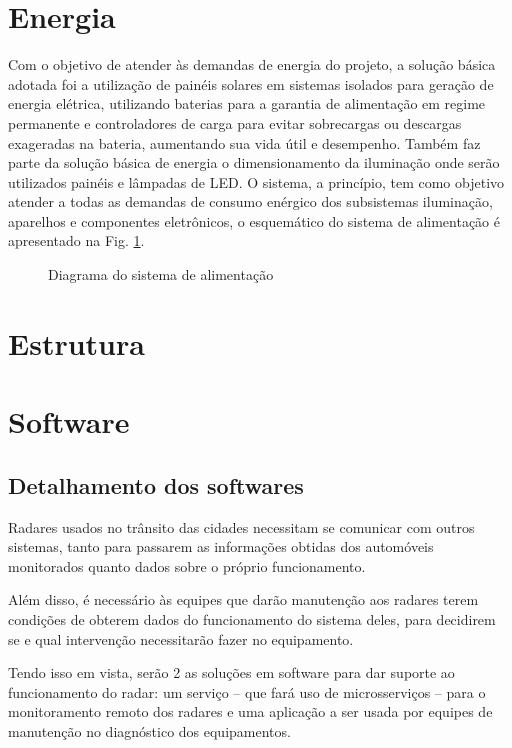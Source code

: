 \section{Energia}

Com o objetivo de atender às demandas de energia do projeto, a solução básica adotada foi a utilização de painéis solares em sistemas isolados para geração de energia elétrica, utilizando baterias para a garantia de alimentação em regime permanente e controladores de carga para evitar sobrecargas ou descargas exageradas na bateria, aumentando sua vida útil e desempenho. Também faz parte da solução básica de energia o dimensionamento da iluminação onde serão utilizados painéis e lâmpadas de LED. O sistema, a princípio, tem como objetivo atender a todas as demandas de consumo enérgico dos subsistemas iluminação, aparelhos e componentes eletrônicos, o esquemático do sistema de alimentação é apresentado na Fig. \ref{fig:diagrama_energia}.

\begin{figure}[!htb]
	\caption{\label{fig:diagrama_energia} Diagrama do sistema de alimentação}
\end{figure}

\section{Estrutura}
\section{Software}

\subsection{Detalhamento dos softwares}
Radares usados no trânsito das cidades necessitam se comunicar com outros sistemas, tanto para passarem as informações obtidas dos automóveis monitorados quanto dados sobre o próprio funcionamento.

Além disso, é necessário às equipes que darão manutenção aos radares terem condições de obterem dados do funcionamento do sistema deles, para decidirem se e qual intervenção necessitarão fazer no equipamento.

Tendo isso em vista, serão 2 as soluções em software para dar suporte ao funcionamento do radar: um serviço -- que fará uso de microsserviços -- para o monitoramento remoto dos radares e uma aplicação a ser usada por equipes de manutenção no diagnóstico dos equipamentos.

